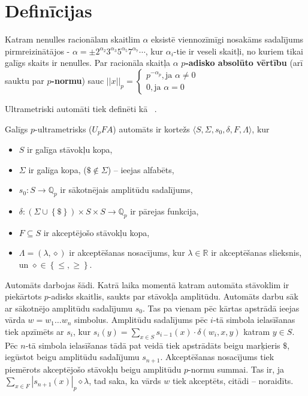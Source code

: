 \documentclass{ludis}
\begin{document}
\chapter {Definīcijas}
\begin{definicija}
Katram nenulles racionālam skaitlim $\alpha$ eksistē viennozīmīgi nosakāms sadalījums pirmreizinātājos - $\alpha = \pm 2^{\alpha_2}3^{\alpha_3}5^{\alpha_5}7^{\alpha_7} \cdots$, kur $\alpha_i$-tie ir veseli skaitļi, no kuriem tikai galīgs skaits ir nenulles. Par racionāla skaitļa $\alpha$ \textbf{$p$-adisko absolūto vērtību} (arī sauktu par \textbf{$p$-normu}) sauc 
$||x||_p = \begin{cases}
p^{-\alpha_p}, \textrm{ja } \alpha \neq 0 \\
0, \textrm{ja } \alpha = 0
\end{cases} $
\end{definicija}


Ultrametriski automāti tiek definēti kā ~\citep{KasparsBalodis2013}.
\begin{definicija}
Galīgs $p$-ultrametrisks ($U_pFA$) automāts ir kortežs $\langle S, \Sigma, s_0, \delta, F, \Lambda \rangle$, kur
\begin{itemize}
  \item $S$ ir galīga stāvokļu kopa,
  \item $\Sigma$ ir galīga kopa, ($\$ \notin \Sigma$) -- ieejas alfabēts,
  \item $s_0:S \rightarrow \mathbb{Q}_p$ ir sākotnējais amplitūdu sadalījums, %
  \item $\delta: \left( \Sigma \cup \left\{ \$ \right\} \right) \times S \times S \rightarrow \mathbb{Q}_p$ ir pārejas funkcija,
  \item $F \subseteq S$ ir akceptējošo stāvokļu kopa,
  \item $\Lambda = \left( \lambda, \diamond \right)$ ir akceptēšanas nosacījums, kur $\lambda \in \mathbb{R}$ ir akceptēšanas slieksnis, un $\diamond \in \left\{ \leq, \geq \right\}$.
\end{itemize}
Automāts darbojas šādi. %
Katrā laika momentā katram automāta stāvoklim ir piekārtots $p$-adisks skaitlis, saukts par stāvokļa amplitūdu.
Automāts darbu sāk ar sākotnējo amplitūdu sadalījumu $s_0$.
Tas pa vienam pēc kārtas apstrādā ieejas vārda $w = w_1 \ldots w_n$ simbolus.
Amplitūdu sadalījums pēc $i$-tā simbola ielasīšanas tiek apzīmēts ar $s_i$, kur
$s_i(y) = \sum_{x \in S}{s_{i-1}(x) \cdot \delta \left( w_i, x, y \right) }$ katram $y \in S$.
Pēc $n$-tā simbola ielasīšanas tādā pat veidā tiek apstrādāts beigu marķieris $\$$, iegūstot beigu amplitūdu sadalījumu $s_{n+1}$.
Akceptēšanas nosacījums tiek piemērots akceptējošo stāvokļu beigu amplitūdu $p$-normu summai. Tas ir, ja $\sum_{x \in F}{\left| s_{n+1}(x) \right|_p} \diamond \lambda$, tad saka, ka vārds $w$ tiek akceptēts, citādi -- noraidīts.
\end{definicija}
\end{document}
